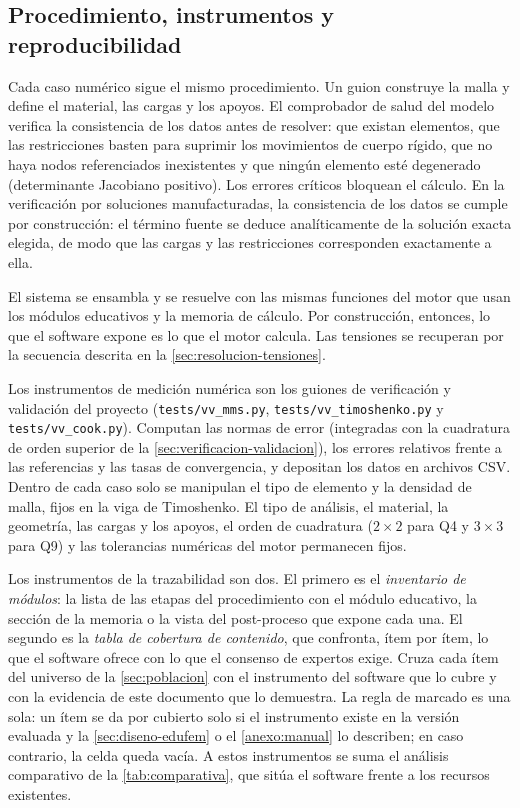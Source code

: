 \subsection{Procedimiento, instrumentos y reproducibilidad}
\label{sec:validacion-datos}

Cada caso numérico sigue el mismo procedimiento. Un guion construye la malla y define el material, las cargas y los apoyos. El comprobador de salud del modelo verifica la consistencia de los datos antes de resolver: que existan elementos, que las restricciones basten para suprimir los movimientos de cuerpo rígido, que no haya nodos referenciados inexistentes y que ningún elemento esté degenerado (determinante Jacobiano positivo). Los errores críticos bloquean el cálculo. En la verificación por soluciones manufacturadas, la consistencia de los datos se cumple por construcción: el término fuente se deduce analíticamente de la solución exacta elegida, de modo que las cargas y las restricciones corresponden exactamente a ella.

El sistema se ensambla y se resuelve con las mismas funciones del motor que usan los módulos educativos y la memoria de cálculo. Por construcción, entonces, lo que el software expone es lo que el motor calcula. Las tensiones se recuperan por la secuencia descrita en la \autoref{sec:resolucion-tensiones}.

Los instrumentos de medición numérica son los guiones de verificación y validación del proyecto (\texttt{tests/vv\_mms.py}, \texttt{tests/vv\_timoshenko.py} y \texttt{tests/vv\_cook.py}). Computan las normas de error (integradas con la cuadratura de orden superior de la \autoref{sec:verificacion-validacion}), los errores relativos frente a las referencias y las tasas de convergencia, y depositan los datos en archivos CSV. Dentro de cada caso solo se manipulan el tipo de elemento y la densidad de malla, fijos en la viga de Timoshenko. El tipo de análisis, el material, la geometría, las cargas y los apoyos, el orden de cuadratura ($2\times2$ para Q4 y $3\times3$ para Q9) y las tolerancias numéricas del motor permanecen fijos.

Los instrumentos de la trazabilidad son dos. El primero es el \emph{inventario de módulos}: la lista de las etapas del procedimiento con el módulo educativo, la sección de la memoria o la vista del post-proceso que expone cada una. El segundo es la \emph{tabla de cobertura de contenido}, que confronta, ítem por ítem, lo que el software ofrece con lo que el consenso de expertos exige. Cruza cada ítem del universo de la \autoref{sec:poblacion} con el instrumento del software que lo cubre y con la evidencia de este documento que lo demuestra. La regla de marcado es una sola: un ítem se da por cubierto solo si el instrumento existe en la versión evaluada y la \autoref{sec:diseno-edufem} o el \autoref{anexo:manual} lo describen; en caso contrario, la celda queda vacía. A estos instrumentos se suma el análisis comparativo de la \autoref{tab:comparativa}, que sitúa el software frente a los recursos existentes.

